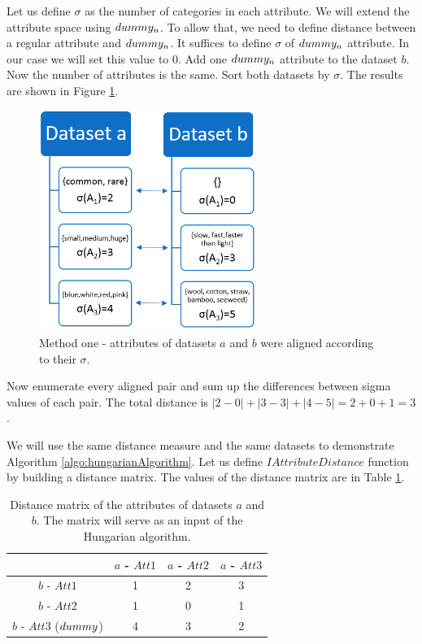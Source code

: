 Let us define $\sigma$ as the number of categories in each attribute. We will extend the attribute space using $dummy_n$. To allow that, we need to define distance between a regular attribute and $dummy_n$. It suffices to define $\sigma$ of $dummy_n$ attribute. In our case we will set this value to 0. Add one $dummy_n$ attribute to the dataset $b$. Now the number of attributes is the same. Sort both datasets by $\sigma$. The results are shown in Figure \ref{fig:example1}.
\begin{figure}	
		\includegraphics[width=7cm]{Images/example1.png}
		\centering
	\caption{Method one - attributes of datasets $a$ and $b$ were aligned according to their $\sigma$.}		\label{fig:example1}	
\end{figure} 
Now enumerate every aligned pair and sum up the differences between sigma values of each pair. The total distance is $|2-0|+|3-3|+|4-5|=2+0+1=3$.

We will use the same distance measure and the same datasets to demonstrate Algorithm \ref{algo:hungarianAlgorithm}. Let us define $IAttributeDistance$ function by building a distance matrix. The values of the distance matrix are in Table \ref{table:distance matrix}.
\begin{table}[htbp]
\caption{Distance matrix of the attributes of datasets $a$ and $b$. The matrix will serve as an input of the Hungarian algorithm.}
\label{table:distance matrix}
\centering
\begin{tabular}{ |c | c | c |c | }
  \hline
  & $a$ - $Att1$ & $a$ - $Att2$ & $a$ - $Att3$  \\
  \hline                       
  $b$ - $Att1$ & 1 & 2 & 3  \\
  $b$ - $Att2$ & 1 & 0 & 1  \\
  $b$ - $Att3$ ($dummy$) & 4  & 3 & 2  \\  
  \hline  
\end{tabular}
\end{table}

